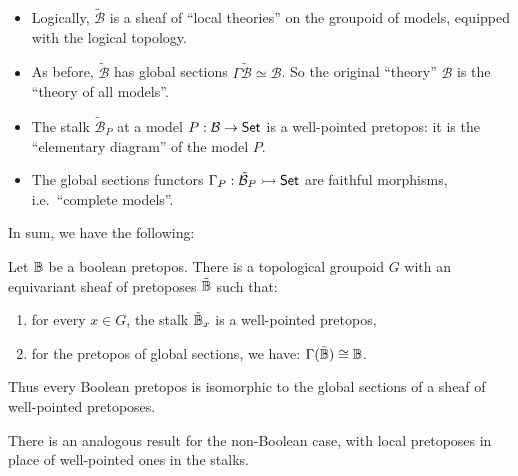 \documentclass[lambek.tex]{subfiles}
\begin{document}
\begin{itemize}
\item Logically, $\tilde{\mathcal{B}}$ is a sheaf of ``local theories'' on the groupoid of models, equipped with the logical topology.  

\item As before, $\tilde{\mathcal{B}}$ has global sections $\Gamma\tilde{\mathcal{B}} \simeq \mathcal{B}$.  So the original ``theory'' $\mathcal{B}$ is the ``theory of all models''.

\item The stalk $\tilde{\mathcal{B}}_P$ at a model $P : \mathcal{B} \to \mathsf{Set}$ is a well-pointed pretopos: it is the ``elementary diagram'' of the model $P$.
\medskip

\item The global sections functors $\Gamma_P : \tilde{\mathcal{B}}_P \rightarrowtail \mathsf{Set}$ are faithful  morphisms, i.e.\ ``complete models''.

\end{itemize}

In sum, we have the following:

\begin{theorem}[A.-Breiner 2013]
Let $\mathbb{B}$ be a boolean pretopos.  
There is a topological groupoid $G$ with an equivariant sheaf of pretoposes $\tilde{\mathbb{B}}$ such that:
\begin{enumerate}
\item for every $x\in G$, the stalk $\tilde{\mathbb{B}}_x$ is a well-pointed pretopos, 
\item for the pretopos of global sections, we have: $\Gamma(\tilde{\mathbb{B}}) \cong \mathbb{B}$.
\end{enumerate}
Thus every Boolean pretopos is isomorphic to the global sections of a sheaf of well-pointed pretoposes.  
\end{theorem}
\medskip

There is an analogous result for the non-Boolean case, with local pretoposes in place of well-pointed ones in the stalks.

\end{document}
